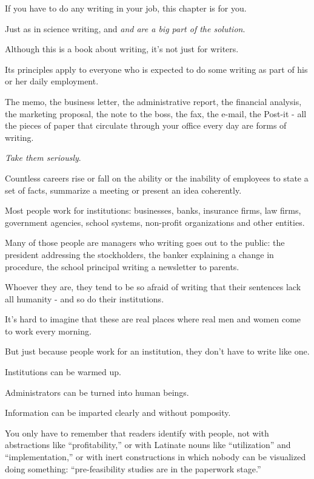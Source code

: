 \documentclass{book}
\numberwithin{equation}{section}
\begin{document}
If you have to do any writing in your job, this chapter is for you.

Just as in science writing,  and \textit{ and  are a big part of the solution}.

Although this is a book about writing, it's not just for writers.

Its principles apply to everyone who is expected to do some writing as part of his or her daily employment.

The memo, the business letter, the administrative report, the financial analysis, the marketing proposal, the note to the boss, the fax, the e-mail, the Post-it - all the pieces of paper that circulate through your office every day are forms of writing.

\textit{Take them seriously}.

Countless careers rise or fall on the ability or the inability of employees to state a set of facts, summarize a meeting or present an idea coherently.

%
Most people work for institutions: businesses, banks, insurance firms, law firms, government agencies, school systems, non-profit organizations and other entities.

Many of those people are managers who writing goes out to the public: the president addressing the stockholders, the banker explaining a change in procedure, the school principal writing a newsletter to parents.

Whoever they are, they tend to be so afraid of writing that their sentences lack all humanity - and so do their institutions.

It's hard to imagine that these are real places where real men and women come to work every morning.

%
But just because people work for an institution, they don't have to write like one.

Institutions can be warmed up.

Administrators can be turned into human beings.

Information can be imparted clearly and without pomposity.

You only have to remember that readers identify with people, not with abstractions like ``profitability,'' or with Latinate nouns like ``utilization'' and ``implementation,'' or with inert constructions in which nobody can be visualized doing something: ``pre-feasibility studies are in the paperwork stage.''
\end{document}
